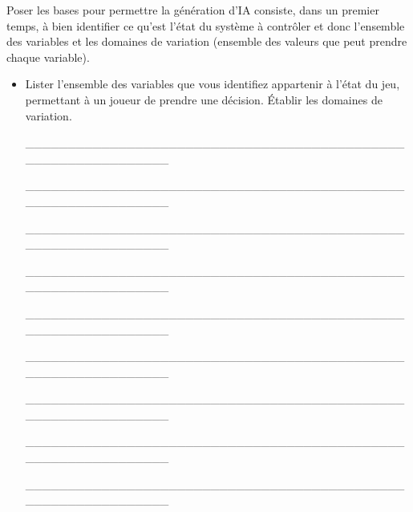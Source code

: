 \documentclass[a4paper, 10pt]{article}
\begin{document}
  Poser les bases pour permettre la génération d'IA consiste, dans un premier temps, à bien identifier ce qu'est l'état du système à contrôler et donc l'ensemble des variables et les domaines de variation (ensemble des valeurs que peut prendre chaque variable).

\begin{itemize}[$\bigcirc$]
\item Lister l'ensemble des variables que vous identifiez appartenir à l'état du jeu, permettant à un joueur de prendre une décision.
Établir les domaines de variation.

\medskip

\_\_\_\_\_\_\_\_\_\_\_\_\_\_\_\_\_\_\_\_\_\_\_\_\_\_\_\_\_\_\_\_\_\_\_\_\_\_\_\_\_\_\_\_\_\_\_\_\_\_\_\_\_\_\_\_\_\_\_\_\_\_

\medskip

\_\_\_\_\_\_\_\_\_\_\_\_\_\_\_\_\_\_\_\_\_\_\_\_\_\_\_\_\_\_\_\_\_\_\_\_\_\_\_\_\_\_\_\_\_\_\_\_\_\_\_\_\_\_\_\_\_\_\_\_\_\_

\medskip

\_\_\_\_\_\_\_\_\_\_\_\_\_\_\_\_\_\_\_\_\_\_\_\_\_\_\_\_\_\_\_\_\_\_\_\_\_\_\_\_\_\_\_\_\_\_\_\_\_\_\_\_\_\_\_\_\_\_\_\_\_\_

\medskip

\_\_\_\_\_\_\_\_\_\_\_\_\_\_\_\_\_\_\_\_\_\_\_\_\_\_\_\_\_\_\_\_\_\_\_\_\_\_\_\_\_\_\_\_\_\_\_\_\_\_\_\_\_\_\_\_\_\_\_\_\_\_

\medskip

\_\_\_\_\_\_\_\_\_\_\_\_\_\_\_\_\_\_\_\_\_\_\_\_\_\_\_\_\_\_\_\_\_\_\_\_\_\_\_\_\_\_\_\_\_\_\_\_\_\_\_\_\_\_\_\_\_\_\_\_\_\_

\medskip

\_\_\_\_\_\_\_\_\_\_\_\_\_\_\_\_\_\_\_\_\_\_\_\_\_\_\_\_\_\_\_\_\_\_\_\_\_\_\_\_\_\_\_\_\_\_\_\_\_\_\_\_\_\_\_\_\_\_\_\_\_\_

\medskip

\_\_\_\_\_\_\_\_\_\_\_\_\_\_\_\_\_\_\_\_\_\_\_\_\_\_\_\_\_\_\_\_\_\_\_\_\_\_\_\_\_\_\_\_\_\_\_\_\_\_\_\_\_\_\_\_\_\_\_\_\_\_

\medskip

\_\_\_\_\_\_\_\_\_\_\_\_\_\_\_\_\_\_\_\_\_\_\_\_\_\_\_\_\_\_\_\_\_\_\_\_\_\_\_\_\_\_\_\_\_\_\_\_\_\_\_\_\_\_\_\_\_\_\_\_\_\_

\medskip

\_\_\_\_\_\_\_\_\_\_\_\_\_\_\_\_\_\_\_\_\_\_\_\_\_\_\_\_\_\_\_\_\_\_\_\_\_\_\_\_\_\_\_\_\_\_\_\_\_\_\_\_\_\_\_\_\_\_\_\_\_\_

\medskip


\end{itemize}
\end{document}
